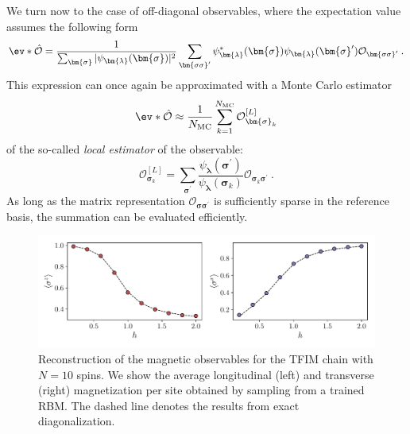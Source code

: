 \documentclass[submission, Phys, hidelnks]{SciPost}
\begin{document}
We turn now to the case of off-diagonal observables, where the expectation
value assumes the following form
\begin{equation}
    \ev*{\hat{\mathcal{O}}} = \frac{1}{\sum_{\bm{\sigma}} |\psi_{\bm{\lambda}}(\bm{\sigma})|^2}
    \sum_{\bm{\sigma\sigma}^\prime} \psi_{\bm{\lambda}}^*(\bm{\sigma})
    \psi_{\bm{\lambda}}(\bm{\sigma}^\prime)\mathcal{O}_{\bm{\sigma\sigma}^\prime}\:.
\end{equation}
This expression can once again be approximated with a Monte Carlo estimator
\begin{equation}
    \ev*{\hat{\mathcal{O}}} \approx \frac{1}{N_{\rm MC}} \sum_{k=1}^{N_{\rm MC}} \mathcal{O}^{[L]}_{\bm{\sigma}_k}
\end{equation}
of the so-called \emph{local estimator} of the observable:
\begin{equation}
    \mathcal{O}^{[L]}_{\bm{\sigma}_k}=\sum_{\bm{\sigma}^\prime}\frac{\psi_{\bm{\lambda}}(\bm{\sigma}^\prime)}{\psi_{\bm{\lambda}}(\bm{\sigma}_k)} \mathcal{O}_{\bm{\sigma}_k\bm{\sigma}^\prime}\:.
\end{equation}
As long as the matrix representation $\mathcal{O}_{\bm{\sigma\sigma}^\prime}$
is sufficiently sparse in the reference basis, the summation can be evaluated
efficiently.

\begin{figure}[t]
    \centering{}
    \includegraphics[width=\columnwidth, trim={0 15 0 0}, clip]{obs.pdf}
    \caption{
        Reconstruction of the magnetic observables for the TFIM chain with
        $N=10$ spins. We show the average longitudinal (left) and transverse
        (right) magnetization per site obtained by sampling from a trained RBM.\@
        The dashed line denotes the results from exact diagonalization.
    }\label{tfim_magn}
\end{figure}
\end{document}
